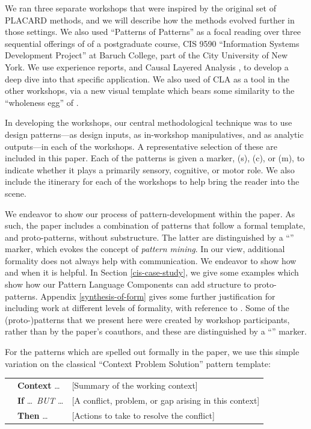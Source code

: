 \documentclass[acmlarge,timestamp]{acmart}
\begin{document}
We ran three separate workshops that were inspired by the original set
of PLACARD methods, and we will describe how the methods evolved
further in those settings.  We also used “Patterns of Patterns” as a
focal reading over three sequential offerings of of a postgraduate
course, CIS 9590 “Information Systems Development Project” at Baruch
College, part of the City University of New York.  We use experience
reports, and Causal Layered Analysis \cite{inayatullah1998b}, to
develop a deep dive into that specific application.  We also used of
CLA as a tool in the other workshops, via a new visual template which
bears some similarity to the “wholeness egg” of
\citet{wholeness-egg-II}.

In developing the workshops, our central methodological technique was
to use design patterns—as design inputs, as in-workshop manipulatives,
and as analytic outputs—in each of the workshops.  A representative
selection of these are included in this paper.  Each of the patterns
is given a marker, (s), (c), or (m), to indicate whether it plays a
primarily sensory, cognitive, or motor role.  We also include the
itinerary for each of the workshops to help bring the reader into the
scene.

We endeavor to show our process of pattern-development within the
paper.  As such, the paper includes a combination of patterns that
follow a formal template, and proto-patterns, without substructure.
The latter are distinguished by a “” marker, which evokes the
concept of \emph{pattern mining}.  In our view, additional formality
does not always help with communication.  We endeavor to show how and
when it is helpful.  In Section \ref{cis-case-study}, we give some
examples which show how our {\sc Pattern Language Components} can add
structure to proto-patterns.  Appendix \ref{synthesis-of-form} gives
some further justification for including work at different levels of
formality, with reference to \citet{alexander1964notes}.  Some of the
(proto-)patterns that we present here were created by workshop
participants, rather than by the paper’s coauthors, and these are
distinguished by a “” marker.

For the patterns which are spelled out formally in the paper, we use
this simple variation on the classical “Context Problem Solution”
pattern template:
\smallskip

\begin{tabular}{lll}
\phantom{hellohellohello}& \textbf{Context} \ldots & {[}Summary of the working context{]}\\
\phantom{hellohellohello}&\textbf{If} \ldots\ \emph{BUT} \ldots & {[}A conflict, problem, or gap arising in this context{]}  \\
\phantom{hellohellohello}&\textbf{Then} \ldots & {[}Actions to take to resolve the conflict{]}
\end{tabular}
\smallskip
\end{document}
